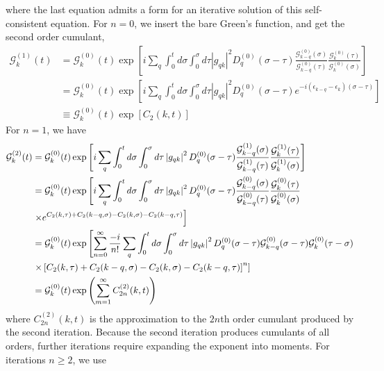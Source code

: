 where the last equation admits a form for an iterative solution of this self-consistent equation. For $n=0$, we insert the bare Green's function, and get the second order cumulant,
\begin{align}
    \mathcal{G}_k^{(1)}(t)&=\mathcal{G}_k^{(0)}(t) \exp \left[i \sum_q \int_0^t d \sigma \int_0^\sigma d \tau\left|g_{q k}\right|^2 D_q^{(0)}(\sigma-\tau) \frac{\mathcal{G}_{k-q}^{(0)}(\sigma)}{\mathcal{G}_{k-q}^{(0)}(\tau)} \frac{\mathcal{G}_k^{(0)}(\tau)}{\mathcal{G}_k^{(0)}(\sigma)}\right] \\
&=\mathcal{G}_k^{(0)}(t) \exp \left[i \sum_q \int_0^t d \sigma \int_0^\sigma d \tau\left|g_{q k}\right|^2 D_q^{(0)}(\sigma-\tau) e^{-i\left(\epsilon_{k-q}-\epsilon_k\right)(\sigma-\tau)}\right] \\
&\equiv\mathcal{G}_k^{(0)}(t) \exp \left[C_2(k, t)\right]
\end{align}
For $n=1$, we have
\begin{align}
    \mathcal{G}_k^{(2)}(t)&=\mathcal{G}_k^{(0)}(t) \exp \left[i \sum_q \int_0^t d \sigma \int_0^\sigma d \tau\left|g_{q k}\right|^2 D_q^{(0)}(\sigma-\tau) \frac{\mathcal{G}_{k-q}^{(1)}(\sigma)}{\mathcal{G}_{k-q}^{(1)}(\tau)} \frac{\mathcal{G}_k^{(1)}(\tau)}{\mathcal{G}_k^{(1)}(\sigma)}\right] \label{iterative_step} \\
&=\mathcal{G}_k^{(0)}(t) \exp \left[i \sum_q \int_0^t d \sigma \int_0^\sigma d \tau\left|g_{q k}\right|^2 D_q^{(0)}(\sigma-\tau) \frac{\mathcal{G}_{k-q}^{(0)}(\sigma)}{\mathcal{G}_{k-q}^{(0)}(\tau)} \frac{\mathcal{G}_k^{(0)}(\tau)}{\mathcal{G}_k^{(0)}(\sigma)}\right. \notag \\
&\left.\times e^{C_2(k, \tau)+C_2(k-q, \sigma)-C_2(k, \sigma)-C_2(k-q, \tau)}\right] \\
&=\mathcal{G}_k^{(0)}(t) \exp \left[\sum_{n=0}^{\infty} \frac{-i}{n!} \sum_q \int_0^t d \sigma \int_0^\sigma d \tau \left|g_{q k}\right|^2 D_q^{(0)}(\sigma-\tau) \mathcal{G}_{k-q}^{(0)}(\sigma-\tau) \mathcal{G}_k^{(0)}(\tau-\sigma)\right. \\
& \left.\times\left[C_2(k, \tau)+C_2(k-q, \sigma)-C_2(k, \sigma)-C_2(k-q, \tau)\right]^n\right]\\
&=\mathcal{G}_k^{(0)}(t) \exp \left(\sum_{m=1}^{\infty} C_{2n}^{(2)}(k, t)\right)
\end{align}
where $C_{2n}^{(2)}(k, t)$ is the approximation to the $2n$th order cumulant produced by the second iteration.
Because the second iteration produces cumulants of all orders, further iterations require expanding the exponent into moments. For iterations $n \geq 2$, we use
